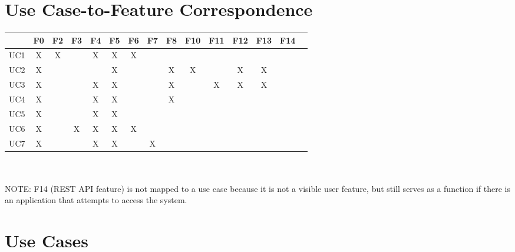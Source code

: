 \documentclass{article}
\begin{document}
\section{Use Case-to-Feature Correspondence}
\begin{tabular}{ | c || c | c | c | c | c | c | c | c | c | c | c | c | c | c | }
\hline
    & F0 & F2 & F3 & F4 & F5 & F6 & F7 & F8 & F10 & F11 & F12 & F13 & F14 \\
\hline
\hline
UC1  &  X &  X &    &  X &  X &  X &    &    &    &    &    &    &    \\
\hline
UC2  &  X &    &    &    &  X &    &    &  X &  X &    &  X &  X &    \\
\hline
UC3  &  X &    &    &  X &  X &    &    &  X &    &  X &  X &  X &    \\
\hline
UC4  &  X &    &    &  X &  X &    &    &  X &    &    &    &    &    \\
\hline
UC5  &  X &    &    &  X &  X &    &    &    &    &    &    &    &    \\
\hline
UC6  &  X &    &  X &  X &  X &  X &    &    &    &    &    &    &    \\
\hline
UC7  &  X &    &    &  X &  X &    &  X &    &    &    &    &    &    \\
\hline
\end{tabular}\\ \\
NOTE: F14 (REST API feature) is not mapped to a use case because it is not a visible user feature, but still serves as a function if there is an application that attempts to access the system.

\section{Use Cases}
\label{use_case}
\end{document}
